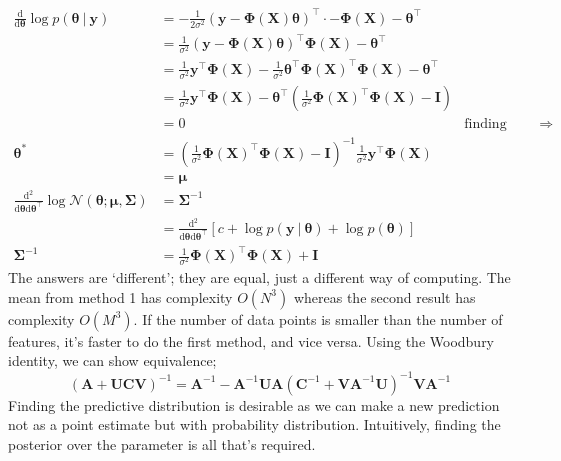 \documentclass[a4paper, 12pt]{article}
\newcommand{\dif}[2]{\frac{\mathrm{d}#1}{\mathrm{d}#2}}
\newcommand{\mat}[1]{\boldsymbol{#1}}
\renewcommand{\vec}[1]{\boldsymbol{#1}}
\begin{document}
            \begin{align*}
                \dif{}{\vec{\theta}} \log p(\vec{\theta}\ |\ \vec{y}) & = -\frac{1}{2\sigma^2}(\vec{y} - \mat{\Phi}(\mat{X})\vec{\theta})^\top \cdot -\mat{\Phi}(\mat{X}) - \vec{\theta}^\top \\
                & = \frac{1}{\sigma^2}(\vec{y} - \mat{\Phi}(\mat{X})\vec{\theta})^\top \mat{\Phi}(\mat{X}) - \vec{\theta}^\top \\
                & = \frac{1}{\sigma^2}\vec{y}^\top\mat{\Phi}(\mat{X}) - \frac{1}{\sigma^2}\vec{\theta}^\top\mat{\Phi}(\mat{X})^\top\mat{\Phi}(\mat{X}) - \vec{\theta}^\top \\
                & = \frac{1}{\sigma^2}\vec{y}^\top\mat{\Phi}(\mat{X}) - \vec{\theta}^\top\left(\frac{1}{\sigma^2}\mat{\Phi}(\mat{X})^\top\mat{\Phi}(\mat{X}) - \mat{I}\right) \\
                & = 0 & \text{finding maximum} \Rightarrow \\
                \vec{\theta^*} & = \left(\frac{1}{\sigma^2}\mat{\Phi}(\mat{X})^\top\mat{\Phi}(\mat{X}) - \mat{I}\right)^{-1} \frac{1}{\sigma^2}\vec{y}^\top\mat{\Phi}(\mat{X}) \\
                & = \vec{\mu} \\
                \dif{^2}{\vec{\theta}\mathrm{d}\vec{\theta}^\top} \log \mathcal{N}(\vec{\theta}; \vec{\mu}, \mat{\Sigma}) & = \mat{\Sigma}^{-1} \\
                & = \dif{^2}{\vec{\theta}\mathrm{d}\vec{\theta}^\top} [c + \log p(\vec{y}\ |\ \vec{\theta}) + \log p(\vec{\theta})] \\
                \mat{\Sigma}^{-1} & = \frac{1}{\sigma^2} \mat{\Phi}(\mat{X})^\top\mat{\Phi}(\mat{X}) + \mat{I}
            \end{align*}
            The answers are `different'; they are equal, just a different way of computing.
            The mean from method 1 has complexity $O(N^3)$ whereas the second result has complexity $O(M^3)$.
            If the number of data points is smaller than the number of features, it's faster to do the first method, and vice versa.
            Using the Woodbury identity, we can show equivalence;
            $$(\mat{A} + \mat{U}\mat{C}\mat{V})^{-1} = \mat{A}^{-1} - \mat{A}^{-1}\mat{U}\mat{A}(\mat{C}^{-1} + \mat{V}\mat{A}^{-1}\mat{U})^{-1}\mat{V}\mat{A}^{-1}$$
            Finding the predictive distribution is desirable as we can make a new prediction not as a point estimate but with probability distribution.
            Intuitively, finding the posterior over the parameter is all that's required.
\end{document}
